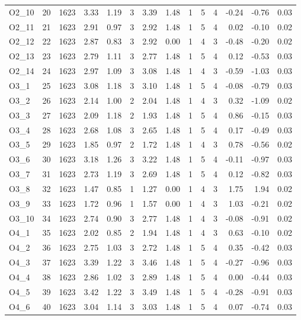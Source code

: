 \begin{tabular}{lrrrrrrrrrrrrr}
O2\_10 & 20 & 1623 & 3.33 & 1.19 & 3 & 3.39 & 1.48 & 1 & 5 & 4 & -0.24 & -0.76 & 0.03\\
\addlinespace
O2\_11 & 21 & 1623 & 2.91 & 0.97 & 3 & 2.92 & 1.48 & 1 & 5 & 4 & 0.02 & -0.10 & 0.02\\
O2\_12 & 22 & 1623 & 2.87 & 0.83 & 3 & 2.92 & 0.00 & 1 & 4 & 3 & -0.48 & -0.20 & 0.02\\
O2\_13 & 23 & 1623 & 2.79 & 1.11 & 3 & 2.77 & 1.48 & 1 & 5 & 4 & 0.12 & -0.53 & 0.03\\
O2\_14 & 24 & 1623 & 2.97 & 1.09 & 3 & 3.08 & 1.48 & 1 & 4 & 3 & -0.59 & -1.03 & 0.03\\
O3\_1 & 25 & 1623 & 3.08 & 1.18 & 3 & 3.10 & 1.48 & 1 & 5 & 4 & -0.08 & -0.79 & 0.03\\
\addlinespace
O3\_2 & 26 & 1623 & 2.14 & 1.00 & 2 & 2.04 & 1.48 & 1 & 4 & 3 & 0.32 & -1.09 & 0.02\\
O3\_3 & 27 & 1623 & 2.09 & 1.18 & 2 & 1.93 & 1.48 & 1 & 5 & 4 & 0.86 & -0.15 & 0.03\\
O3\_4 & 28 & 1623 & 2.68 & 1.08 & 3 & 2.65 & 1.48 & 1 & 5 & 4 & 0.17 & -0.49 & 0.03\\
O3\_5 & 29 & 1623 & 1.85 & 0.97 & 2 & 1.72 & 1.48 & 1 & 4 & 3 & 0.78 & -0.56 & 0.02\\
O3\_6 & 30 & 1623 & 3.18 & 1.26 & 3 & 3.22 & 1.48 & 1 & 5 & 4 & -0.11 & -0.97 & 0.03\\
\addlinespace
O3\_7 & 31 & 1623 & 2.73 & 1.19 & 3 & 2.69 & 1.48 & 1 & 5 & 4 & 0.12 & -0.82 & 0.03\\
O3\_8 & 32 & 1623 & 1.47 & 0.85 & 1 & 1.27 & 0.00 & 1 & 4 & 3 & 1.75 & 1.94 & 0.02\\
O3\_9 & 33 & 1623 & 1.72 & 0.96 & 1 & 1.57 & 0.00 & 1 & 4 & 3 & 1.03 & -0.21 & 0.02\\
O3\_10 & 34 & 1623 & 2.74 & 0.90 & 3 & 2.77 & 1.48 & 1 & 4 & 3 & -0.08 & -0.91 & 0.02\\
O4\_1 & 35 & 1623 & 2.02 & 0.85 & 2 & 1.94 & 1.48 & 1 & 4 & 3 & 0.63 & -0.10 & 0.02\\
\addlinespace
O4\_2 & 36 & 1623 & 2.75 & 1.03 & 3 & 2.72 & 1.48 & 1 & 5 & 4 & 0.35 & -0.42 & 0.03\\
O4\_3 & 37 & 1623 & 3.39 & 1.22 & 3 & 3.46 & 1.48 & 1 & 5 & 4 & -0.27 & -0.96 & 0.03\\
O4\_4 & 38 & 1623 & 2.86 & 1.02 & 3 & 2.89 & 1.48 & 1 & 5 & 4 & 0.00 & -0.44 & 0.03\\
O4\_5 & 39 & 1623 & 3.42 & 1.22 & 3 & 3.49 & 1.48 & 1 & 5 & 4 & -0.28 & -0.91 & 0.03\\
O4\_6 & 40 & 1623 & 3.04 & 1.14 & 3 & 3.03 & 1.48 & 1 & 5 & 4 & 0.07 & -0.74 & 0.03\\

\end{tabular}
